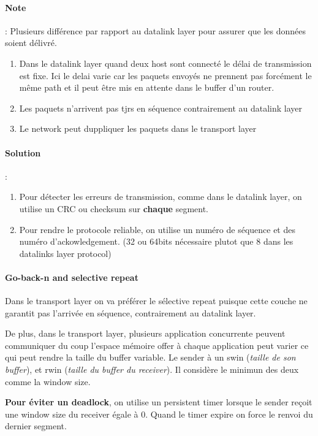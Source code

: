 \documentclass{report}
\begin{document}
\paragraph{Note} : Plusieurs différence par rapport au datalink layer pour assurer que les
données soient délivré. 

\begin{enumerate}  
    \item Dans  le datalink  layer quand  deux host  sont
connecté le délai de transmission est fixe. Ici le delai varie car les
paquets envoyés  ne prennent pas  forcément le  même path et  il peut
être mis en attente dans le buffer d'un router.
    \item Les paquets n'arrivent pas tjrs en séquence contrairement au datalink layer
    \item Le network peut duppliquer les paquets dans le transport layer
\end{enumerate}

\paragraph{Solution} :
\begin{enumerate}
    \item Pour détecter les erreurs de transmission, comme dans le datalink layer, on utilise un
    CRC ou checksum sur \textbf{chaque} segment.
    \item Pour rendre le protocole reliable, on utilise un numéro de séquence et des numéro
    d'ackowledgement. (32 ou 64bits nécessaire plutot que 8 dans les datalinks layer protocol)
\end{enumerate}

\paragraph{Go-back-n and selective repeat}
Dans le transport layer on va préférer le sélective repeat puisque cette couche 
ne garantit pas l'arrivée en séquence, contrairement au datalink layer.

De plus, dans le transport layer, plusieurs application concurrente peuvent communiquer
du coup l'espace mémoire offer à chaque application peut varier ce qui peut rendre la
taille du buffer variable.
Le sender à un swin (\textit{taille de son buffer}), et rwin (\textit{taille du buffer du receiver}). Il considère le minimun des deux comme la window size.


\textbf{Pour éviter un deadlock}, on utilise un persistent timer lorsque le sender reçoit une
window size du receiver égale à 0. Quand le timer expire on force le renvoi du dernier segment.
\end{document}
